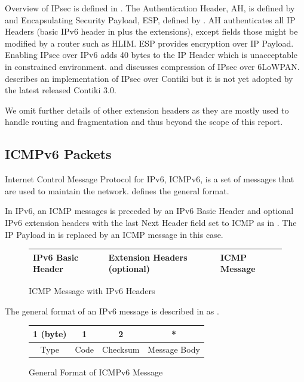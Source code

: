 \begin{description}[style=nextline]
\item[\textbf{IPsec}]
Overview of IPsec is defined in \cite{rfc4301}. The Authentication Header, AH, is defined by \cite{rfc4302} and Encapsulating Security Payload, ESP, defined by \cite{rfc4303}. AH authenticates all IP Headers (basic IPv6 header in  plus the extensions), except fields those might be modified by a router such as HLIM. ESP provides encryption over IP Payload. Enabling IPsec over IPv6 adds 40 bytes to the IP Header which is unacceptable in constrained environment. \cite{6LoWPANIPsec} and \cite{CompressIPsec} discusses compression of IPsec over 6LoWPAN. \cite{ContikiIPsec} describes an implementation of IPsec over Contiki but it is not yet adopted by the latest released Contiki 3.0.
\end{description}

We omit further details of other extension headers as they are mostly used to handle routing and fragmentation and thus beyond the scope of this report.

\subsection{ICMPv6 Packets} \label{Subsec: ICMPv6}
Internet Control Message Protocol for IPv6, ICMPv6, is a set of messages that are used to maintain the network. \cite{rfc4443} defines the general format. 

In IPv6, an ICMP messages is preceded by an IPv6 Basic Header and optional IPv6 extension headers with the last Next Header field set to ICMP as in . The IP Payload in  is replaced by an ICMP message in this case.

\begin{figure}[th!]
	\centering
	\begin{tabular}{|l|l|l|}
		\hline
		IPv6 Basic Header & Extension Headers (optional) & ICMP Message \\ \hline
	\end{tabular}
	\caption{ICMP Message with IPv6 Headers}
	\label{Fig: ICMP with IPv6}
\end{figure}

The general format of an IPv6 message is described in \cite{rfc4443} as .
\begin{figure}[th!]
	\centering
	\begin{tabular}{|c|c|c|c|}
	\hline
	1 (byte) & 1    & 2        & *            \\ \hline
	Type     & Code & Checksum & Message Body \\ \hline
	\end{tabular}
	\caption{General Format of ICMPv6 Message}
	\label{Fig: General Format of ICMPv6 Message}
\end{figure}

